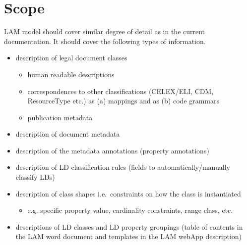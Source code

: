 \section{Scope}
\label{ariaid-title1}

LAM model should cover similar degree of detail as in the current
documentation. It should cover the following types of information.

\begin{itemize}
\item
  description of legal document classes

  \begin{itemize}
  \item
    human readable descriptions
  \item
    correspondences to other classifications (CELEX/ELI, CDM,
    ResourceType etc.) as (a) mappings and as (b) code grammars
  \item
    publication metadata
  \end{itemize}
\item
  description of document metadata
\item
  description of the metadata annotations (property annotations)
\item
  description of LD classification rules (fields to
  automatically/manually classify LDs)
\item
  description of class shapes i.e.~constraints on how the class is
  instantiated

  \begin{itemize}
  \item
    e.g. specific property value, cardinality constraints, range class,
    etc.
  \end{itemize}
\item
  descriptions of LD classes and LD property groupings (table of
  contents in the LAM word document and templates in the LAM webApp
  description)
\end{itemize}
